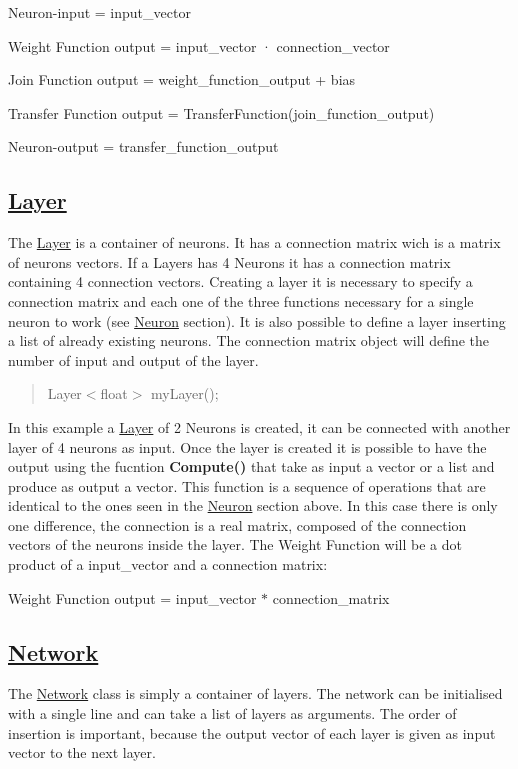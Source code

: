 \begin{DoxyItemize}
\item Neuron-\/input = input\-\_\-vector
\item Weight Function output = input\-\_\-vector · connection\-\_\-vector
\item Join Function output = weight\-\_\-function\-\_\-output + bias
\item Transfer Function output = Transfer\-Function(join\-\_\-function\-\_\-output)
\item Neuron-\/output = transfer\-\_\-function\-\_\-output
\end{DoxyItemize}

\subsection*{\hyperlink{class_layer}{Layer} }

The \hyperlink{class_layer}{Layer} is a container of neurons. It has a connection matrix wich is a matrix of neurons vectors. If a Layers has 4 Neurons it has a connection matrix containing 4 connection vectors. Creating a layer it is necessary to specify a connection matrix and each one of the three functions necessary for a single neuron to work (see \hyperlink{class_neuron}{Neuron} section). It is also possible to define a layer inserting a list of already existing neurons. The connection matrix object will define the number of input and output of the layer.

\begin{quotation}


Layer$<$float$>$ my\-Layer();

\end{quotation}


In this example a \hyperlink{class_layer}{Layer} of 2 Neurons is created, it can be connected with another layer of 4 neurons as input. Once the layer is created it is possible to have the output using the fucntion {\bfseries Compute()} that take as input a vector or a list and produce as output a vector. This function is a sequence of operations that are identical to the ones seen in the \hyperlink{class_neuron}{Neuron} section above. In this case there is only one difference, the connection is a real matrix, composed of the connection vectors of the neurons inside the layer. The Weight Function will be a dot product of a input\-\_\-vector and a connection matrix\-:


\begin{DoxyItemize}
\item Weight Function output = input\-\_\-vector $\ast$ connection\-\_\-matrix
\end{DoxyItemize}

\subsection*{\hyperlink{class_network}{Network} }

The \hyperlink{class_network}{Network} class is simply a container of layers. The network can be initialised with a single line and can take a list of layers as arguments. The order of insertion is important, because the output vector of each layer is given as input vector to the next layer. 